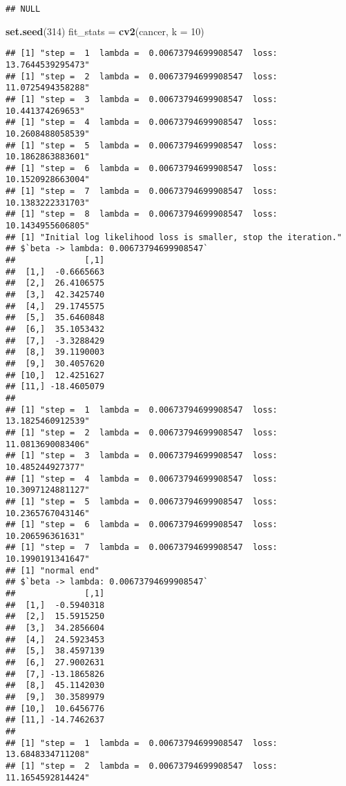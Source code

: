 \documentclass[
]{article}
\newenvironment{Shaded}{\begin{snugshade}}{\end{snugshade}}
\newcommand{\AttributeTok}[1]{\textcolor[rgb]{0.13,0.29,0.53}{#1}}
\newcommand{\DecValTok}[1]{\textcolor[rgb]{0.00,0.00,0.81}{#1}}
\newcommand{\FunctionTok}[1]{\textcolor[rgb]{0.13,0.29,0.53}{\textbf{#1}}}
\newcommand{\NormalTok}[1]{#1}
\newcommand{\OtherTok}[1]{\textcolor[rgb]{0.56,0.35,0.01}{#1}}
\begin{document}
\begin{verbatim}
## NULL
\end{verbatim}

\begin{Shaded}
\begin{Highlighting}[]
\FunctionTok{set.seed}\NormalTok{(}\DecValTok{314}\NormalTok{)}
\NormalTok{fit\_stats }\OtherTok{=} \FunctionTok{cv2}\NormalTok{(cancer, }\AttributeTok{k =} \DecValTok{10}\NormalTok{)}
\end{Highlighting}
\end{Shaded}

\begin{verbatim}
## [1] "step =  1  lambda =  0.00673794699908547  loss:  13.7644539295473"
## [1] "step =  2  lambda =  0.00673794699908547  loss:  11.0725494358288"
## [1] "step =  3  lambda =  0.00673794699908547  loss:  10.441374269653"
## [1] "step =  4  lambda =  0.00673794699908547  loss:  10.2608488058539"
## [1] "step =  5  lambda =  0.00673794699908547  loss:  10.1862863883601"
## [1] "step =  6  lambda =  0.00673794699908547  loss:  10.1520928663004"
## [1] "step =  7  lambda =  0.00673794699908547  loss:  10.1383222331703"
## [1] "step =  8  lambda =  0.00673794699908547  loss:  10.1434955606805"
## [1] "Initial log likelihood loss is smaller, stop the iteration."
## $`beta -> lambda: 0.00673794699908547`
##              [,1]
##  [1,]  -0.6665663
##  [2,]  26.4106575
##  [3,]  42.3425740
##  [4,]  29.1745575
##  [5,]  35.6460848
##  [6,]  35.1053432
##  [7,]  -3.3288429
##  [8,]  39.1190003
##  [9,]  30.4057620
## [10,]  12.4251627
## [11,] -18.4605079
## 
## [1] "step =  1  lambda =  0.00673794699908547  loss:  13.1825460912539"
## [1] "step =  2  lambda =  0.00673794699908547  loss:  11.0813690083406"
## [1] "step =  3  lambda =  0.00673794699908547  loss:  10.485244927377"
## [1] "step =  4  lambda =  0.00673794699908547  loss:  10.3097124881127"
## [1] "step =  5  lambda =  0.00673794699908547  loss:  10.2365767043146"
## [1] "step =  6  lambda =  0.00673794699908547  loss:  10.206596361631"
## [1] "step =  7  lambda =  0.00673794699908547  loss:  10.1990191341647"
## [1] "normal end"
## $`beta -> lambda: 0.00673794699908547`
##              [,1]
##  [1,]  -0.5940318
##  [2,]  15.5915250
##  [3,]  34.2856604
##  [4,]  24.5923453
##  [5,]  38.4597139
##  [6,]  27.9002631
##  [7,] -13.1865826
##  [8,]  45.1142030
##  [9,]  30.3589979
## [10,]  10.6456776
## [11,] -14.7462637
## 
## [1] "step =  1  lambda =  0.00673794699908547  loss:  13.6848334711208"
## [1] "step =  2  lambda =  0.00673794699908547  loss:  11.1654592814424"

\end{verbatim}
\end{document}
